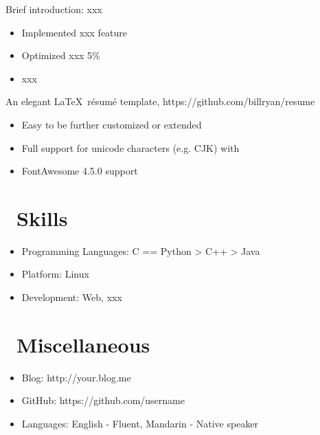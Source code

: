 \documentclass{resume}
\begin{document}
Brief introduction: xxx
\begin{itemize}
  \item Implemented xxx feature
  \item Optimized xxx 5\%
  \item xxx
\end{itemize}

An elegant \LaTeX\ résumé template, https://github.com/billryan/resume
\begin{itemize}
  \item Easy to be further customized or extended
  \item Full support for unicode characters (e.g. CJK) with \XeLaTeX\
  \item FontAwesome 4.5.0 support
\end{itemize}


\section{\faCogs\ Skills}
\begin{itemize}[parsep=0.5ex]
  \item Programming Languages: C == Python > C++ > Java
  \item Platform: Linux
  \item Development: Web, xxx
\end{itemize}


\section{\faInfo\ Miscellaneous}
\begin{itemize}[parsep=0.5ex]
  \item Blog: http://your.blog.me
  \item GitHub: https://github.com/username
  \item Languages: English - Fluent, Mandarin - Native speaker
\end{itemize}

%
%
\end{document}
